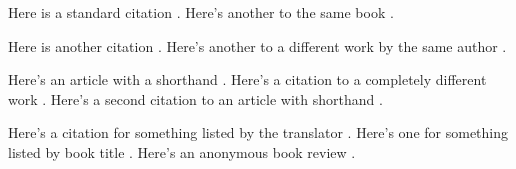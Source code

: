 \documentclass[12pt]{article}
\begin{document}
	Here is a standard citation \autocite[32]{haggis99aa}.  Here's another to the same book \autocite[33--40]{haggis99aa}.
	
	Here is another citation \autocite[12]{askme06aa}.  Here's another to a different work by the same author \autocite[30]{askme92aa}.
	
	Here's an article with a shorthand \autocite[12]{taskme06aa}.  Here's a citation to a completely different work \autocite[32]{haggis99aa}. Here's a second citation to an article with shorthand \autocite[17]{taskme06aa}.
	
	Here's a citation for something listed by the translator \autocite[22]{coulson64aa}.  Here's one for something listed by book title \autocite[978]{octovian86aa}.  Here's an anonymous book review \autocite{danish1972aa}.

\nocite{*}
\newpage
\printbibliography[heading=bibintoc]
\end{document}

